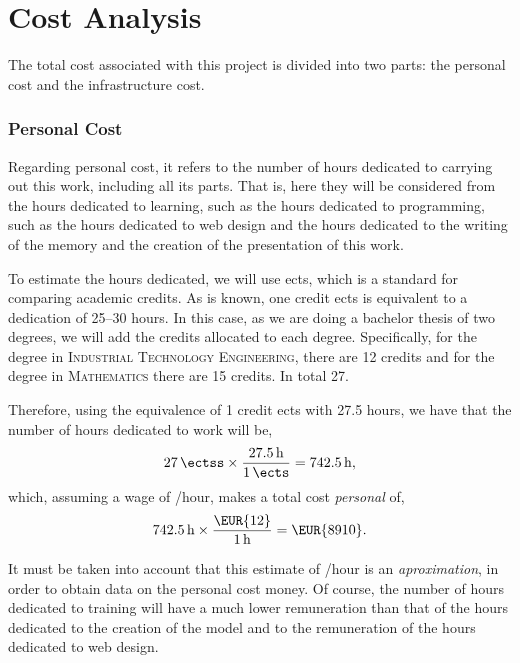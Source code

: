 \section{Cost Analysis} \label{sec:cost}

The total cost associated with this project is divided into two parts: the
personal cost and the infrastructure cost.

\subsubsection{Personal Cost}

Regarding personal cost, it refers to the number of hours dedicated to carrying
out this work, including all its parts. That is, here they will be considered
from the hours dedicated to learning, such as the hours dedicated to
programming, such as the hours dedicated to web design and the hours dedicated
to the writing of the memory and the creation of the presentation of this work.

To estimate the hours dedicated, we will use \gls{ects}, which is a standard
for comparing academic credits. As is known, one credit \gls{ects} is
equivalent to a dedication of 25--30 hours. In this case, as we are doing a
bachelor thesis of two degrees, we will add the credits allocated to each
degree. Specifically, for the degree in \textsc{Industrial Technology
  Engineering}, there are 12 credits and for the degree in \textsc{Mathematics}
there are 15 credits. In total \SI{27}{\ectss}.

Therefore, using the equivalence of 1 credit \gls{ects} with 27.5 hours, we
have that the number of hours dedicated to work will be,
\begin{equation}
  \SI{27}{\ectss} \times \frac{\SI{27.5}{\hour}}{\SI{1}{\ects}} =
  \SI{742.5}{\hour},
\end{equation}
which, assuming a wage of /hour, makes a total cost \emph{personal} of,
\begin{equation}
  \SI{742.5}{\hour} \times \frac{\text{\EUR{12}}}{\SI{1}{\hour}} =
  \text{\EUR{\num{8910}}}.
\end{equation}

\begin{remarkBox}
  It must be taken into account that this estimate of /hour is an
  \emph{aproximation}, in order to obtain data on the personal cost money. Of
  course, the number of hours dedicated to training will have a much lower
  remuneration than that of the hours dedicated to the creation of the model
  and to the remuneration of the hours dedicated to web design.
\end{remarkBox}

